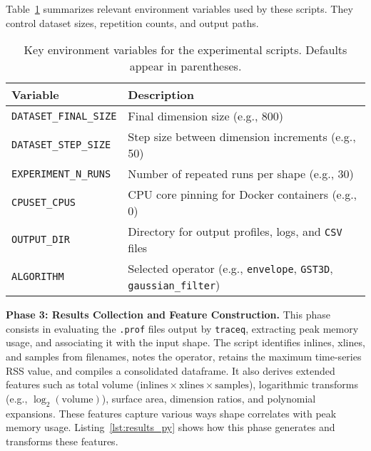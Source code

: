 \noindent
Table~\ref{tab:env_vars} summarizes relevant environment variables used by these scripts.
They control dataset sizes, repetition counts, and output paths.

\begin{table}[htbp]
    \centering
    \caption{Key environment variables for the experimental scripts.
    Defaults appear in parentheses.
    \vspace{1em}}
    \label{tab:env_vars}
    \begin{tabular}{ll}
        \hline
        \textbf{Variable}             & \textbf{Description}                                                                        \\
        \hline
        \texttt{DATASET\_FINAL\_SIZE} & Final dimension size (e.g., 800)                                                            \\
        \texttt{DATASET\_STEP\_SIZE}  & Step size between dimension increments (e.g., 50)                                           \\
        \texttt{EXPERIMENT\_N\_RUNS}  & Number of repeated runs per shape (e.g., 30)                                                \\
        \texttt{CPUSET\_CPUS}         & \ac{CPU} core pinning for Docker containers (e.g., 0)                                       \\
        \texttt{OUTPUT\_DIR}          & Directory for output profiles, logs, and \texttt{\ac{CSV}} files                            \\
        \texttt{ALGORITHM}            & Selected operator (e.g., \texttt{envelope}, \texttt{\ac{GST3D}}, \texttt{gaussian\_filter}) \\
        \hline
    \end{tabular}
\end{table}

\vspace{1em}
\noindent
\textbf{Phase 3: Results Collection and Feature Construction.}
This phase consists in evaluating the \texttt{.prof} files output by \texttt{traceq}, extracting peak memory usage, and associating it with the input shape.
The script identifies inlines, xlines, and samples from filenames, notes the operator, retains the maximum time-series \ac{RSS} value, and compiles a consolidated dataframe.
It also derives extended features such as total volume
(\(\text{inlines} \times \text{xlines} \times \text{samples}\)),
logarithmic transforms
(e.g., \(\log_2(\text{volume})\)),
surface area,
dimension ratios,
and polynomial expansions.
These features capture various ways shape correlates with peak memory usage.
Listing~\ref{lst:results_py} shows how this phase generates and transforms these features.

